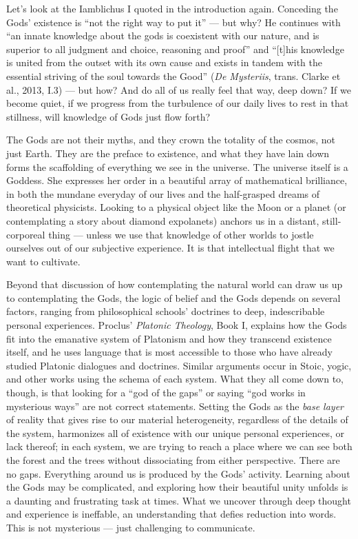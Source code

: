 \documentclass[
]{book}
\begin{document}
Let's look at the Iamblichus I quoted in the introduction again. Conceding the Gods' existence is ``not the right way to put it'' --- but why? He continues with ``an innate knowledge about the gods is coexistent with our nature, and is superior to all judgment and choice, reasoning and proof'' and ``{[}t{]}his knowledge is united from the outset with its own cause and exists in tandem with the essential striving of the soul towards the Good'' (\emph{De Mysteriis}, trans. Clarke et al., 2013, I.3) --- but how? And do all of us really feel that way, deep down? If we become quiet, if we progress from the turbulence of our daily lives to rest in that stillness, will knowledge of Gods just flow forth?

The Gods are not their myths, and they crown the totality of the cosmos, not just Earth. They are the preface to existence, and what they have lain down forms the scaffolding of everything we see in the universe. The universe itself is a Goddess. She expresses her order in a beautiful array of mathematical brilliance, in both the mundane everyday of our lives and the half-grasped dreams of theoretical physicists. Looking to a physical object like the Moon or a planet (or contemplating a story about diamond expolanets) anchors us in a distant, still-corporeal thing --- unless we use that knowledge of other worlds to jostle ourselves out of our subjective experience. It is that intellectual flight that we want to cultivate.

Beyond that discussion of how contemplating the natural world can draw us up to contemplating the Gods, the logic of belief and the Gods depends on several factors, ranging from philosophical schools' doctrines to deep, indescribable personal experiences. Proclus' \emph{Platonic Theology}, Book I, explains how the Gods fit into the emanative system of Platonism and how they transcend existence itself, and he uses language that is most accessible to those who have already studied Platonic dialogues and doctrines. Similar arguments occur in Stoic, yogic, and other works using the schema of each system. What they all come down to, though, is that looking for a ``god of the gaps'' or saying ``god works in mysterious ways'' are not correct statements. Setting the Gods as the \emph{base layer} of reality that gives rise to our material heterogeneity, regardless of the details of the system, harmonizes all of existence with our unique personal experiences, or lack thereof; in each system, we are trying to reach a place where we can see both the forest and the trees without dissociating from either perspective. There are no gaps. Everything around us is produced by the Gods' activity. Learning about the Gods may be complicated, and exploring how their beautiful unity unfolds is a daunting and frustrating task at times. What we uncover through deep thought and experience is ineffable, an understanding that defies reduction into words. This is not mysterious --- just challenging to communicate.
\end{document}
